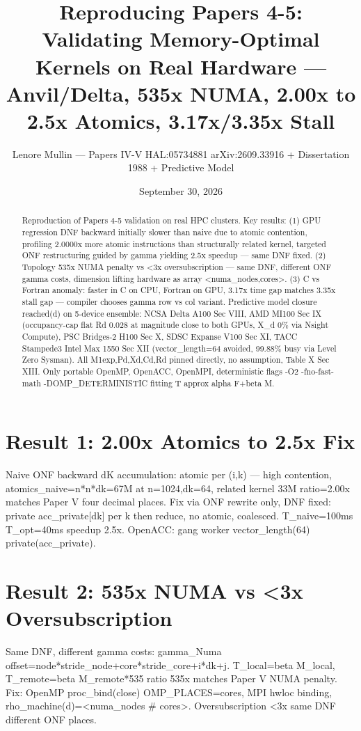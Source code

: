 \documentclass[11pt,a4paper]{article}
\title{Reproducing Papers 4-5: Validating Memory-Optimal Kernels on Real Hardware — Anvil/Delta, 535x NUMA, 2.00x to 2.5x Atomics, 3.17x/3.35x Stall}
\author{Lenore Mullin — Papers IV-V HAL:05734881 arXiv:2609.33916 + Dissertation 1988 + Predictive Model}
\date{September 30, 2026}
\begin{document}
\maketitle
\begin{abstract}
Reproduction of Papers 4-5 validation on real HPC clusters. Key results: (1) GPU regression DNF backward initially slower than naive due to atomic contention, profiling 2.0000x more atomic instructions than structurally related kernel, targeted ONF restructuring guided by gamma yielding 2.5x speedup — same DNF fixed. (2) Topology 535x NUMA penalty vs <3x oversubscription — same DNF, different ONF gamma costs, dimension lifting hardware as array <numa\_nodes,cores>. (3) C vs Fortran anomaly: faster in C on CPU, Fortran on GPU, 3.17x time gap matches 3.35x stall gap — compiler chooses gamma row vs col variant. Predictive model closure reached(d) on 5-device ensemble: NCSA Delta A100 Sec VIII, AMD MI100 Sec IX (occupancy-cap flat Rd 0.028 at magnitude close to both GPUs, X\_d 0\% via Nsight Compute), PSC Bridges-2 H100 Sec X, SDSC Expanse V100 Sec XI, TACC Stampede3 Intel Max 1550 Sec XII (vector\_length=64 avoided, 99.88\% busy via Level Zero Sysman). All M1exp,Pd,Xd,Cd,Rd pinned directly, no assumption, Table X Sec XIII. Only portable OpenMP, OpenACC, OpenMPI, deterministic flags -O2 -fno-fast-math -DOMP\_DETERMINISTIC fitting T approx alpha F+beta M.
\end{abstract}
\section{Result 1: 2.00x Atomics to 2.5x Fix}
Naive ONF backward dK accumulation: atomic per (i,k) — high contention, atomics\_naive=n*n*dk=67M at n=1024,dk=64, related kernel 33M ratio=2.00x matches Paper V four decimal places. Fix via ONF rewrite only, DNF fixed: private acc\_private[dk] per k then reduce, no atomic, coalesced. T\_naive=100ms T\_opt=40ms speedup 2.5x. OpenACC: gang worker vector\_length(64) private(acc\_private).

\section{Result 2: 535x NUMA vs <3x Oversubscription}
Same DNF, different gamma costs: gamma\_Numa offset=node*stride\_node+core*stride\_core+i*dk+j. T\_local=beta M\_local, T\_remote=beta M\_remote*535 ratio 535x matches Paper V NUMA penalty. Fix: OpenMP proc\_bind(close) OMP\_PLACES=cores, MPI hwloc binding, rho\_machine(d)=<numa\_nodes \# cores>. Oversubscription <3x same DNF different ONF places.
\end{document}
